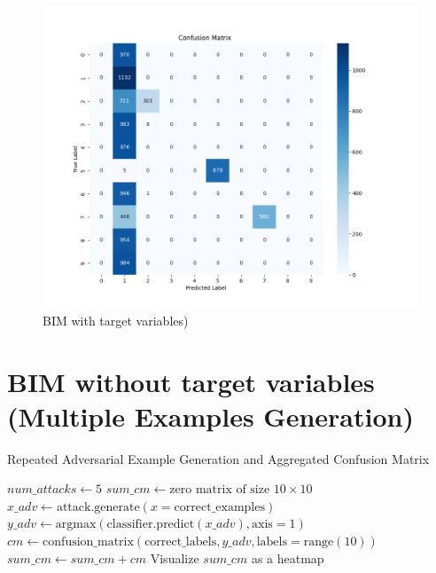 \documentclass[11pt,onside]{article}
\begin{document}
\begin{figure}[h]
\centering
\includegraphics[width=1\textwidth]{V1_images/BIM_with_target.png}
\caption{BIM with target variables)}
\label{fig: BIM with target variables)}
\end{figure}


\section{BIM without target variables (Multiple Examples Generation)}


\begin{algorithm}[H]
\caption{Repeated Adversarial Example Generation and Aggregated Confusion Matrix}
\begin{algorithmic}[1]
\State $num\_attacks \gets 5$
\State $sum\_cm \gets \text{zero matrix of size } 10 \times 10$
    \State $x\_adv \gets \text{attack.generate}(x=\text{correct\_examples})$
    \State $y\_adv \gets \text{argmax}(\text{classifier.predict}(x\_adv), \text{axis}=1)$
    \State $cm \gets \text{confusion\_matrix}(\text{correct\_labels}, y\_adv, \text{labels}=\text{range}(10))$
    \State $sum\_cm \gets sum\_cm + cm$
\EndFor
\State Visualize $sum\_cm$ as a heatmap
\end{algorithmic}
\end{algorithm}
\end{document}
